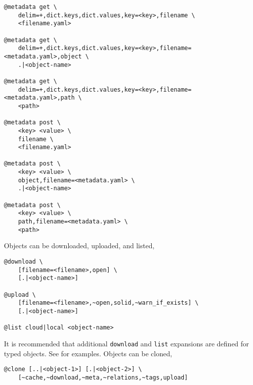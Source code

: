 %
\begin{verbatim}
@metadata get \
    delim=+,dict.keys,dict.values,key=<key>,filename \
    <filename.yaml>
    
@metadata get \
    delim=+,dict.keys,dict.values,key=<key>,filename=<metadata.yaml>,object \
    .|<object-name>
    
@metadata get \
    delim=+,dict.keys,dict.values,key=<key>,filename=<metadata.yaml>,path \
    <path>
    
@metadata post \
    <key> <value> \
    filename \
    <filename.yaml>
    
@metadata post \
    <key> <value> \
    object,filename=<metadata.yaml> \
    .|<object-name>
    
@metadata post \
    <key> <value> \
    path,filename=<metadata.yaml> \
    <path>
\end{verbatim}
%
Objects can be downloaded, uploaded, and listed,
%
\begin{verbatim}
@download \
    [filename=<filename>,open] \
    [.|<object-name>]

@upload \
    [filename=<filename>,~open,solid,~warn_if_exists] \
    [.|<object-name>]
    
@list cloud|local <object-name>
\end{verbatim}
%
It is recommended that additional \texttt{download} and \texttt{list} expansions are defined for typed objects. See  for examples. Objects can be cloned,
%
\begin{verbatim}
@clone [..|<object-1>] [.|<object-2>] \
    [~cache,~download,~meta,~relations,~tags,upload]
\end{verbatim}